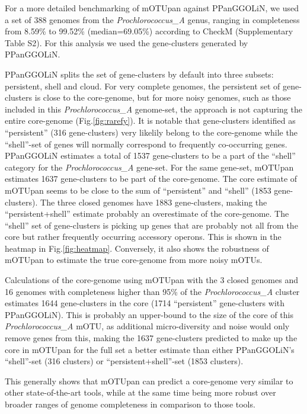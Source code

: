 \documentclass{article}
\begin{document}
For a more detailed benchmarking of mOTUpan against PPanGGOLiN, we used a set of 388 genomes from the \textit{Prochlorococcus\_A} genus, ranging in completeness from 8.59\% to 99.52\% (median=69.05\%) according to CheckM (Supplementary Table S2).  For this analysis we used the gene-clusters generated by PPanGGOLiN.

PPanGGOLiN splits the set of  gene-clusters by default into three subsets: persistent, shell and cloud. For very complete genomes, the persistent set of gene-clusters is close to the core-genome, but for more noisy genomes, such as those included in this \textit{Prochlorococcus\_A} genome-set, the approach is not capturing the entire core-genome (Fig.\ref{fig:rarefy}). It is notable that gene-clusters identified as ``persistent'' (316 gene-clusters) very likelily belong to the core-genome while the ``shell''-set of genes will normally correspond to frequently co-occurring genes. PPanGGOLiN estimates a total of 1537 gene-clusters to be a part of the ``shell'' category for the \textit{Prochlorococcus\_A} gene-set. For the same gene-set, mOTUpan estimates 1637 gene-clusters to be part of the core-genome. The core estimate of mOTUpan seems to be close to the sum of ``persistent'' and ``shell'' (1853 gene-clusters). The three closed genomes have 1883 gene-clusters, making the ``persistent+shell'' estimate probably an overestimate of the core-genome. The ``shell'' set of gene-clusters is picking up genes that are probably not all from the core but rather frequently occurring accessory operons. This is shown in the heatmap in Fig.\ref{fig:heatmap}. Conversely, it also shows the robustness of mOTUpan to estimate the true core-genome from more noisy mOTUs.

Calculations of the core-genome using mOTUpan with the 3 closed genomes and 16 genomes with completeness higher than 95\% of the \textit{Prochlorococcus\_A} cluster estimates 1644 gene-clusters in the core (1714 ``persistent'' gene-clusters with PPanGGOLiN). This is probably an upper-bound to the size of the core of this \textit{Prochlorococcus\_A} mOTU, as additional micro-diversity and noise would only remove genes from this, making the 1637 gene-clusters predicted to make up the core in mOTUpan for the full set a better estimate than either PPanGGOLiN’s ``shell''-set (316 clusters) or ``persistent+shell''-set (1853 clusters).

This generally shows that mOTUpan can predict a core-genome very similar to other state-of-the-art tools, while at the same time being more robust over broader ranges of genome completeness in comparison to those tools.
\end{document}
